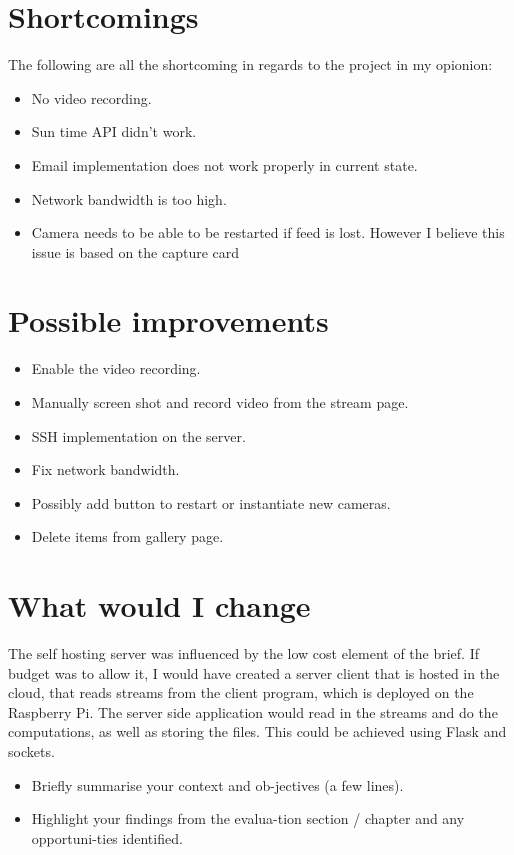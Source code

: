 \section{Shortcomings}
The following are all the shortcoming in regards to the project in my opionion:
\begin{itemize}
    \item No video recording.
    \item Sun time API didn't work.
    \item Email implementation does not work properly in current state.
    \item Network bandwidth is too high.
    \item Camera needs to be able to be restarted if feed is lost. However I believe this issue is based on the capture card
\end{itemize}
\section{Possible improvements}
\begin{itemize}
    \item Enable the video recording.
    \item Manually screen shot and record video from the stream page.
    \item SSH implementation on the server.
    \item Fix network bandwidth.
    \item Possibly add button to restart or instantiate new cameras.
    \item Delete items from gallery page.
\end{itemize}
\section{What would I change}
The self hosting server was influenced by the low cost element of the brief. If budget was to allow it, I would have created a server client that is hosted in the cloud, that reads streams from the client program, which is deployed on the Raspberry Pi. The server side application would read in the streams and do the computations, as well as storing the files. This could be achieved using Flask and sockets.
\begin{itemize}
\item Briefly summarise your context and ob-jectives (a few lines).
\item Highlight your findings from the evalua-tion section / chapter and any opportuni-ties identified.
\end{itemize}
